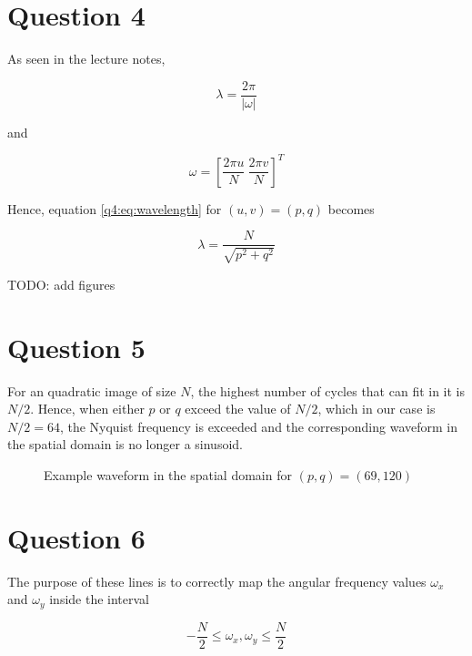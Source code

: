 \documentclass[12pt]{article}
\begin{document}
	\section{Question 4}
	
		As seen in the lecture notes, 
		
		\begin{equation}
			\lambda = \frac{2 \pi}{|\omega|}
			\label{q4:eq:wavelength}
		\end{equation}
		
		and 
		
		\begin{equation}
			\omega = [\frac{2 \pi u}{N} \ \frac{2 \pi v}{N}]^T
		\end{equation}
		
		Hence, equation \ref{q4:eq:wavelength} for $(u,v)=(p,q)$ becomes
		
		\begin{equation}
			\lambda = \frac{N}{\sqrt{p^2+q^2}}
		\end{equation}
		
		TODO: add figures
		
		
	\section{Question 5}
	
		For an quadratic image of size $N$, the highest number of cycles that can fit in it is $N/2$. 
		Hence, when either $p$ or $q$ exceed the value of $N/2$, which in our case is $N/2 = 64$, the Nyquist frequency is exceeded
		and the corresponding waveform in the spatial domain is no longer a sinusoid.
		
		\begin{figure}[!htb]
			\centering
			\scalebox{.5}{}
			\caption{Example waveform in the spatial domain for $(p,q)=(69,120)$}
			\label{fig:}
	  	\end{figure}
	  	
	
	\section{Question 6}
	
		The purpose of these lines is to correctly map the angular frequency values $\omega_x$ and $\omega_y$ inside the interval
		
		\begin{equation}
			-\frac{N}{2} \leq \omega_x, \omega_y \leq \frac{N}{2}
		\end{equation}

	
\end{document}
